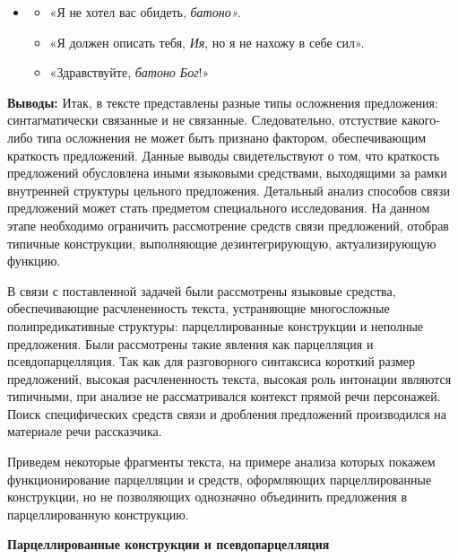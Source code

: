 \documentclass{kursa4}
\begin{document}
    \begin{itemize}
    \item \begin{itemize}
    \item «Я не хотел вас обидеть, \textit{батоно».}
    \item «Я должен описать тебя, \textit{Ия}, но я не нахожу в себе сил».
    \item «Здравствуйте, \textit{батоно Бог}!»
    \end{itemize}
    \end{itemize}

    \bigskip

    \textbf{Выводы:} Итак, в тексте представлены разные типы осложнения
    предложения: синтагматически связанные и не связанные. Следовательно,
    отстуствие какого-либо типа осложнения не может быть признано фактором,
    обеспечивающим краткость предложений. Данные выводы свидетельствуют о
    том, что краткость предложений обусловлена иными языковыми средствами,
    выходящими за рамки внутренней структуры цельного предложения.
    Детальный анализ способов связи предложений может стать предметом
    специального исследования. На данном этапе необходимо ограничить
    рассмотрение средств связи предложений, отобрав типичные конструкции,
    выполняющие дезинтегрирующую, актуализирующую функцию.

    В связи с поставленной задачей были рассмотрены языковые средства,
    обеспечивающие расчлененность текста, устраняющие многосложные
    полипредикативные структуры: парцеллированные конструкции и неполные
    предложения. Были рассмотрены такие явления как парцелляция и
    псевдопарцелляция. Так как для разговорного синтаксиса короткий размер
    предложений, высокая расчлененность текста, высокая роль интонации
    являются типичными, при анализе не рассматривался контекст прямой
    речи персонажей. Поиск специфических средств связи и дробления
    предложений производился на материале речи рассказчика. 

    Приведем некоторые фрагменты текста, на примере анализа которых
    покажем функционирование парцелляции и средств, оформляющих
    парцеллированные конструкции, но не позволяющих однозначно объединить
    предложения в парцеллированную конструкцию.


    \bigskip

    {\centering
    \textbf{Парцеллированные конструкции и псевдопарцелляция}
    \par}
\end{document}

